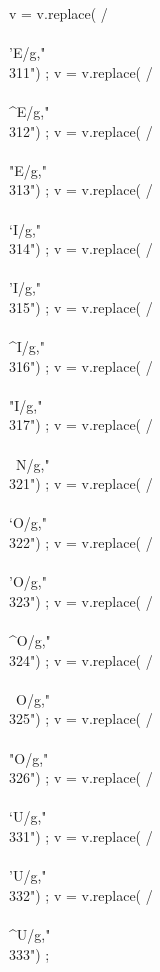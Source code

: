 {      v = v.replace(  /\\\\'E/g,"\\311") ;
      v = v.replace(  /\\\\^E/g,"\\312") ;
      v = v.replace(  /\\\\"E/g,"\\313") ;
      v = v.replace(  /\\\\`I/g,"\\314") ;
      v = v.replace(  /\\\\'I/g,"\\315") ;
      v = v.replace(  /\\\\^I/g,"\\316") ;
      v = v.replace(  /\\\\"I/g,"\\317") ;
      v = v.replace(  /\\\\~N/g,"\\321") ;
      v = v.replace(  /\\\\`O/g,"\\322") ;
      v = v.replace(  /\\\\'O/g,"\\323") ;
      v = v.replace(  /\\\\^O/g,"\\324") ;
      v = v.replace(  /\\\\~O/g,"\\325") ;
      v = v.replace(  /\\\\"O/g,"\\326") ;
      v = v.replace(  /\\\\`U/g,"\\331") ;
      v = v.replace(  /\\\\'U/g,"\\332") ;
      v = v.replace(  /\\\\^U/g,"\\333") ;
}
